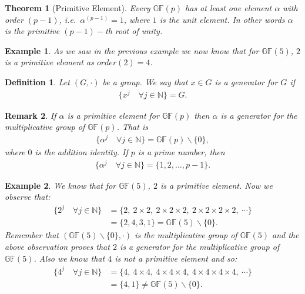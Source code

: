 \documentclass[12pt]{article}
\newtheorem{theorem}{Theorem}
\newtheorem{example}{Example}
\newtheorem{definition}{Definition}
\newtheorem{remark}[definition]{Remark}
\newcommand{\gf}[1]{\mathds{GF}\left(#1\right)} %
\begin{document}
\begin{theorem}[Primitive Element]
	Every $\gf{p}$ has at least one element $\alpha$ with order $(p-1)$, i.e.\ $\alpha^{(p-1)} = 1$, where $1$ is the unit element. In other words  $\alpha$ is the primitive $(p-1)-$th root of unity.\\
\end{theorem}

\begin{example}
	As we saw in the previous example we now know that for $\gf{5}$, $2$ is a primitive element as $order(2) = 4$. 
\end{example}

\begin{definition}
	Let $(G,\cdot)$ be a group. We say that $x\in G$ is a generator for $G$ if 
	\begin{align*}
		\{x^ j \quad \forall j\in \mathds{N} \} = G.
	\end{align*}
\end{definition}

\begin{remark}
	If $\alpha$ is a primitive element for $\gf{p}$ then $\alpha$ is a generator for the multiplicative group of $\gf{p}$.  That is 
	\begin{align*}
			\{\alpha^ j \quad \forall j\in \mathds{N} \} = \gf{p}\backslash\{0\},
	\end{align*}
	where $0$ is the addition identity. If $p$ is a prime number, then 
		\begin{align*}
			\{\alpha^ j \quad \forall j\in \mathds{N} \} = \{1,2,\ldots,p-1\}.
	   \end{align*}
	 
\end{remark}



\begin{example}
	We know that for $\gf{5}$, $2$ is a primitive element. Now we observe that:
	\begin{align*}
	\{2^ j \quad \forall j\in \mathds{N} \} &= \{2, ~2\times 2, ~2\times 2\times 2,~ 2\times 2\times 2\times 2, ~ \cdots \} \\
	& = \{2, 4, 3, 1\} = \gf{5}\backslash\{0\} .
	\end{align*}
	Remember that $(\gf{5}\backslash\{0\},\cdot)$ is the multiplicative group of $\gf{5}$ and the above observation proves that $2$ is a generator for the multiplicative group of $\gf{5}$. Also we know that $4$ is not a primitive element and so:
	\begin{align*}
	\{4^ j \quad \forall j\in \mathds{N} \} &= \{4, ~4\times 4, ~4\times 4\times 4,~ 4\times 4\times 4\times 4, ~ \cdots \} \\
	& = \{4,1\} \ne \gf{5}\backslash\{0\} .
	\end{align*}
\end{example}
\end{document}
